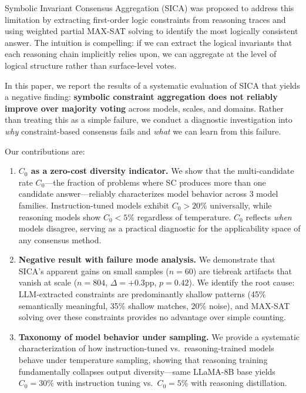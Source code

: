 \documentclass[11pt,a4paper]{article}
\begin{document}
Symbolic Invariant Consensus Aggregation (SICA) was proposed to address this limitation by extracting first-order logic constraints from reasoning traces and using weighted partial MAX-SAT solving to identify the most logically consistent answer.
The intuition is compelling: if we can extract the logical invariants that each reasoning chain implicitly relies upon, we can aggregate at the level of logical structure rather than surface-level votes.

In this paper, we report the results of a systematic evaluation of SICA that yields a negative finding: \textbf{symbolic constraint aggregation does not reliably improve over majority voting} across models, scales, and domains.
Rather than treating this as a simple failure, we conduct a diagnostic investigation into \emph{why} constraint-based consensus fails and \emph{what} we can learn from this failure.

Our contributions are:

\begin{enumerate}
\item \textbf{$C_0$ as a zero-cost diversity indicator.}
We show that the multi-candidate rate $C_0$---the fraction of problems where SC produces more than one candidate answer---reliably characterizes model behavior across 3 model families.
Instruction-tuned models exhibit $C_0>20\%$ universally, while reasoning models show $C_0<5\%$ regardless of temperature.
$C_0$ reflects \emph{when} models disagree, serving as a practical diagnostic for the applicability space of any consensus method.

\item \textbf{Negative result with failure mode analysis.}
We demonstrate that SICA's apparent gains on small samples ($n=60$) are tiebreak artifacts that vanish at scale ($n=804$, $\Delta=+0.3$pp, $p=0.42$).
We identify the root cause: LLM-extracted constraints are predominantly shallow patterns (45\% semantically meaningful, 35\% shallow matches, 20\% noise), and MAX-SAT solving over these constraints provides no advantage over simple counting.

\item \textbf{Taxonomy of model behavior under sampling.}
We provide a systematic characterization of how instruction-tuned vs.\ reasoning-trained models behave under temperature sampling, showing that reasoning training fundamentally collapses output diversity---same LLaMA-8B base yields $C_0=30\%$ with instruction tuning vs.\ $C_0=5\%$ with reasoning distillation.
\end{enumerate}
\end{document}
